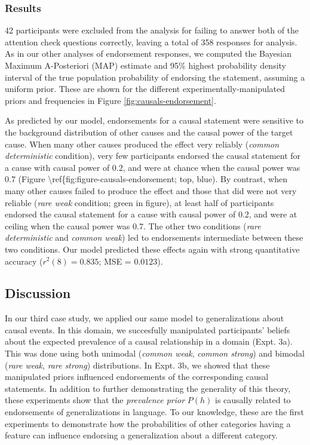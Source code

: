 \documentclass[english,floatsintext,man]{apa6}
\theoremstyle{definition}
\theoremstyle{definition}
\theoremstyle{definition}
\theoremstyle{remark}
\begin{document}
\subsubsection{Results}\label{results-5}

42 participants were excluded from the analysis for failing to answer
both of the attention check questions correctly, leaving a total of 358
responses for analysis. As in our other analyses of endorsement
responses, we computed the Bayesian Maximum A-Posteriori (MAP) estimate
and 95\% highest probability density interval of the true population
probability of endorsing the statement, assuming a uniform prior. These
are shown for the different experimentally-manipulated priors and
frequencies in Figure \ref{fig:causals-endorsement}.

As predicted by our model, endorsements for a causal statement were
sensitive to the background distribution of other causes and the causal
power of the target cause. When many other causes produced the effect
very reliably (\emph{common deterministic} condition), very few
participants endorsed the causal statement for a cause with causal power
of 0.2, and were at chance when the causal power was 0.7 (Figure
\textbackslash{}ref\{fig:figure-causals-endorsement; top, blue). By
contrast, when many other causes failed to produce the effect and those
that did were not very reliable (\emph{rare weak} condition; green in
figure), at least half of participants endorsed the causal statement for
a cause with causal power of 0.2, and were at ceiling when the causal
power was 0.7. The other two conditions (\emph{rare deterministic} and
\emph{common weak}) led to endorsements intermediate between these two
conditions. Our model predicted these effects again with strong
quantitative accuracy (\(r^2(8) = 0.835\); MSE = \(0.0123\)).

\subsection{Discussion}\label{discussion-3}

In our third case study, we applied our same model to generalizations
about causal events. In this domain, we succesfully manipulated
participants' beliefs about the expected prevalence of a causal
relationship in a domain (Expt. 3a). This was done using both unimodal
(\emph{common weak}, \emph{common strong}) and bimodal (\emph{rare
weak}, \emph{rare strong}) distributions. In Expt. 3b, we showed that
these manipulated priors influenced endorsements of the corresponding
causal statements. In addition to further demonstrating the generality
of this theory, these experiments show that the \emph{prevalence prior}
\(P(h)\) is causally related to endorsements of generalizations in
language. To our knowledge, these are the first experiments to
demonstrate how the probabilities of other categories having a feature
can influence endorsing a generalization about a different category.
\end{document}
